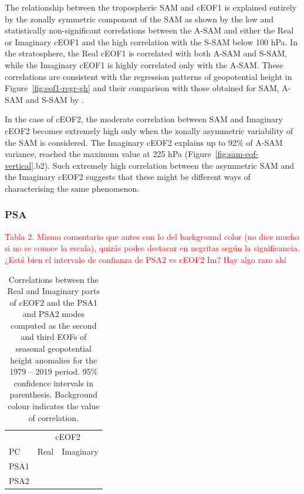 \documentclass[smallextended]{svjour3}       %
\begin{document}
The relationship between the tropospheric SAM and cEOF1 is explained entirely by the zonally symmetric component of the SAM as shown by the low and statistically non-significant correlations between the A-SAM and either the Real or Imaginary cEOF1 and the high correlation with the S-SAM below 100 hPa.
In the stratosphere, the Real cEOF1 is correlated with both A-SAM and S-SAM, while the Imaginary cEOF1 is highly correlated only with the A-SAM.
These correlations are consistent with the regression patterns of geopotential height in Figure~\ref{fig:eof1-regr-gh} and their comparison with those obtained for SAM, A-SAM and S-SAM by \citet{campitelli2021}.

In the case of cEOF2, the moderate correlation between SAM and Imaginary cEOF2 becomes extremely high only when the zonally asymmetric variability of the SAM is considered.
The Imaginary cEOF2 explains up to 92\% of A-SAM variance, reached the maximum value at 225 hPa (Figure~\ref{fig:sam-eof-vertical}.b2).
Such extremely high correlation between the asymmetric SAM and the Imaginary cEOF2 suggests that these might be different ways of characterising the same phenomenon.

\hypertarget{psa}{%
\subsubsection{PSA}\label{psa}}

\textcolor{red}{Tabla 2. Mismo comentario que antes con lo del background color (no dice mucho si no se conoce la escala), quizás podes destacar en negritas según la significancia. ¿Está bien el intervalo de confianza de PSA2 vs cEOF2 Im? Hay algo raro ahí}



\begin{table}

\caption{\label{tab:psa-eof2}Correlations between the Real and Imaginary parts of cEOF2 and the PSA1 and PSA2 modes computed as the second and third EOFs of seasonal geopotential height anomalies \citep[following][]{mo2001} for the 1979 -- 2019 period. 95\% confidence intervals in parenthesis. Background colour indicates the value of correlation.}
\centering
\begin{tabular}[t]{l>{}l>{}l}
\toprule
\multicolumn{1}{c}{} & \multicolumn{2}{c}{cEOF2} \\
\cmidrule(l{3pt}r{3pt}){2-3}
PC & Real & Imaginary\\
\midrule
PSA1 & \cellcolor[HTML]{C3BBDE}{\textcolor{black}{-0.32 (CI: -0.57 -- -0.015)}} & \cellcolor[HTML]{6259AA}{\textcolor{white}{-0.82 (CI: -0.9 -- -0.69)}}\\
PSA2 & \cellcolor[HTML]{9E4E47}{\textcolor{white}{0.81 (CI: 0.67 -- 0.9)}} & \cellcolor[HTML]{F3F2F8}{\textcolor{black}{-0.062 (CI: -0.36 -- 0.25)}}\\
\bottomrule
\end{tabular}
\end{table}
\end{document}
